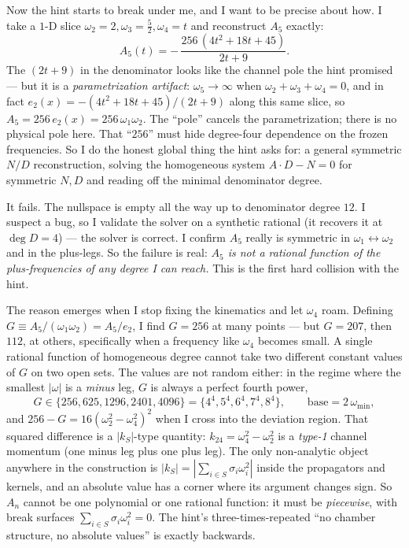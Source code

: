 \documentclass{article}
\begin{document}
Now the hint starts to break under me, and I want to be precise about how. I take
a $1$-D slice $\omega_2{=}2,\omega_3{=}\tfrac52,\omega_4{=}t$ and reconstruct
$A_5$ exactly:
\[
A_5(t) = -\,\frac{256\,(4t^2+18t+45)}{2t+9}.
\]
The $(2t+9)$ in the denominator looks like the channel pole the hint promised ---
but it is a \emph{parametrization artifact}: $\omega_5\to\infty$ when
$\omega_2+\omega_3+\omega_4=0$, and in fact $e_2(x)=-(4t^2+18t+45)/(2t+9)$ along
this same slice, so $A_5=256\,e_2(x)=256\,\omega_1\omega_2$. The ``pole'' cancels
the parametrization; there is no physical pole here. That ``$256$'' must hide
degree-four dependence on the frozen frequencies. So I do the honest global thing
the hint asks for: a general symmetric $N/D$ reconstruction, solving the
homogeneous system $A\cdot D-N=0$ for symmetric $N,D$ and reading off the minimal
denominator degree.

It fails. The nullspace is empty all the way up to denominator degree $12$. I
suspect a bug, so I validate the solver on a synthetic rational (it recovers it at
$\deg D=4$) --- the solver is correct. I confirm $A_5$ really is symmetric in
$\omega_1\leftrightarrow\omega_2$ and in the plus-legs. So the failure is real:
\emph{$A_5$ is not a rational function of the plus-frequencies of any degree I can
reach.} This is the first hard collision with the hint.

The reason emerges when I stop fixing the kinematics and let $\omega_4$ roam.
Defining $G\equiv A_5/(\omega_1\omega_2)=A_5/e_2$, I find $G=256$ at many points
--- but $G=207$, then $112$, at others, specifically when a frequency like
$\omega_4$ becomes small. A single rational function of homogeneous degree cannot
take two different constant values of $G$ on two open sets. The values are not
random either: in the regime where the smallest $|\omega|$ is a \emph{minus} leg,
$G$ is always a perfect fourth power,
\[
G\in\{256,625,1296,2401,4096\}=\{4^4,5^4,6^4,7^4,8^4\},
\qquad \text{base}=2\,\omega_{\min},
\]
and $256-G=16(\omega_2^2-\omega_4^2)^2$ when I cross into the deviation region.
That squared difference is a $|k_S|$-type quantity: $k_{24}=\omega_4^2-\omega_2^2$
is a \emph{type-1} channel momentum (one minus leg plus one plus leg). The only
non-analytic object anywhere in the construction is $|k_S|=|\sum_{i\in
S}\sigma_i\omega_i^2|$ inside the propagators and kernels, and an absolute value
has a corner where its argument changes sign. So $A_n$ cannot be one polynomial or
one rational function: it must be \emph{piecewise}, with break surfaces
$\sum_{i\in S}\sigma_i\omega_i^2=0$. The hint's three-times-repeated ``no chamber
structure, no absolute values'' is exactly backwards.
\end{document}
